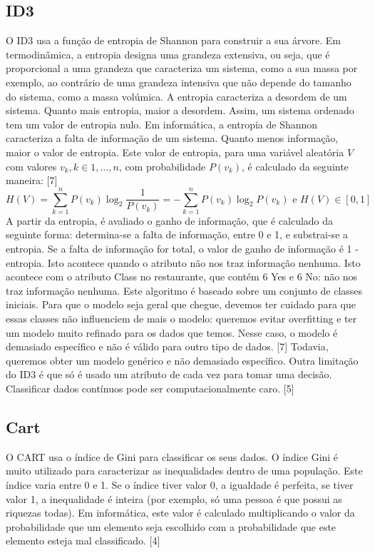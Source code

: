 \documentclass{article}
\begin{document}
\subsection{ID3}
\hspace{10mm}O ID3 usa a função de entropia de Shannon para construir a sua árvore. Em termodinâmica, a entropia designa uma grandeza extensiva, ou seja, que é proporcional a uma grandeza que caracteriza um sistema, como a sua massa por exemplo, ao contrário de uma grandeza intensiva que não depende do tamanho do sistema, como a massa volúmica. A entropia caracteriza a desordem de um sistema. Quanto mais entropia, maior a desordem. Assim, um sistema ordenado tem um valor de entropia nulo.
Em informática, a entropia de Shannon caracteriza a falta de informação de um sistema. Quanto menos informação, maior o valor de entropia. Este valor de entropia, para uma variável aleatória $V$ com valores $v_k, k\in{1,\dots,n}$, com probabilidade $P(v_k)$, é calculado da seguinte maneira: [7]
\[
H(V) = \sum_{k=1}^n{P(v_k)\log_2{\frac{1}{P(v_k)}}} = -\sum_{k=1}^n{P(v_k)\log_2{P(v_k)}} \text{ e }H(V)\in[0,1]
\]
\hspace{10mm}
A partir da entropia, é avaliado o ganho de informação, que é calculado da seguinte forma: determina-se a falta de informação, entre 0 e 1, e substrai-se a entropia. Se a falta de informação for total, o valor de ganho de informação é 1 - entropia. Isto acontece quando o atributo não nos traz informação nenhuma. Isto acontece com o atributo Class no restaurante, que contém 6 Yes e 6 No: não nos traz informação nenhuma.
Este algoritmo é baseado sobre um conjunto de classes iniciais. Para que o modelo seja geral que chegue, devemos ter cuidado para que essas classes não influenciem de mais o modelo: queremos evitar overfitting e ter um modelo muito refinado para os dados que temos. Nesse caso, o modelo é demasiado específico e não é válido para outro tipo de dados. [7]
Todavia, queremos obter um modelo genérico e não demasiado específico. Outra limitação do ID3 é que só é usado um atributo de cada vez para tomar uma decisão. Classificar dados contínuos pode ser computacionalmente caro. [5]
\subsection{Cart}
\hspace{10mm}O CART usa o índice de Gini para classificar os seus dados. O índice Gini é muito utilizado para caracterizar as inequalidades dentro de uma população. Este índice varia entre 0 e 1. Se o índice tiver valor 0, a igualdade é perfeita, se tiver valor 1, a inequalidade é inteira (por exemplo, só uma pessoa é que possui as riquezas todas). Em informática, este valor é calculado multiplicando o valor da probabilidade que um elemento seja escolhido com a probabilidade que este elemento esteja mal classificado. [4]
\end{document}
